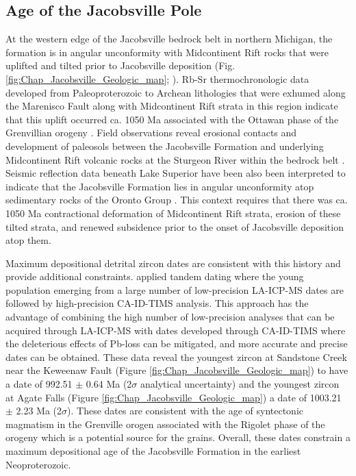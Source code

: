 \subsection*{Age of the Jacobsville Pole}

At the western edge of the Jacobsville bedrock belt in northern Michigan, the formation is in angular unconformity with Midcontinent Rift rocks that were uplifted and tilted prior to Jacobsville deposition (Fig. \ref{fig:Chap_Jacobsville_Geologic_map}; \citealp{Hedgman1992a, Cannon1995a}). Rb-Sr thermochronologic data developed from Paleoproterozoic to Archean lithologies that were exhumed along the Marenisco Fault along with Midcontinent Rift strata in this region indicate that this uplift occurred ca. 1050 Ma associated with the Ottawan phase of the Grenvillian orogeny \citep{Cannon1993a}. Field observations reveal erosional contacts and development of paleosols between the Jacobsville Formation and underlying Midcontinent Rift volcanic rocks at the Sturgeon River within the bedrock belt \citep{Hamblin1958a, Zbinden1988a}. Seismic reflection data beneath Lake Superior have been also been interpreted to indicate that the Jacobsville Formation lies in angular unconformity atop sedimentary rocks of the Oronto Group \citep{Cannon1989a}. This context requires that there was ca. 1050 Ma contractional deformation of Midcontinent Rift strata, erosion of these tilted strata, and renewed subsidence prior to the onset of Jacobsville deposition atop them.

Maximum depositional detrital zircon dates are consistent with this history and provide additional constraints. \cite{Hodgin2022a} applied tandem dating where the young population emerging from a large number of low-precision LA-ICP-MS dates are followed by high-precision CA-ID-TIMS analysis. This approach has the advantage of combining the high number of low-precision analyses that can be acquired through LA-ICP-MS with dates developed through CA-ID-TIMS where the deleterious effects of Pb-loss can be mitigated, and more accurate and precise dates can be obtained. These data reveal the youngest zircon at Sandstone Creek near the Keweenaw Fault (Figure \ref{fig:Chap_Jacobsville_Geologic_map}) to have a date of 992.51 $\pm$ 0.64 Ma (2$\sigma$ analytical uncertainty) and the youngest zircon at Agate Falls (Figure \ref{fig:Chap_Jacobsville_Geologic_map}) a date of 1003.21 $\pm$ 2.23 Ma (2$\sigma$). These dates are consistent with the age of syntectonic magmatism in the Grenville orogen associated with the Rigolet phase of the orogeny \cite[e.g.][]{Bussy1995a, Turlin2019a, Jannin2018a} which is a potential source for the grains. Overall, these dates constrain a maximum depositional age of the Jacobsville Formation in the earliest Neoproterozoic. 

